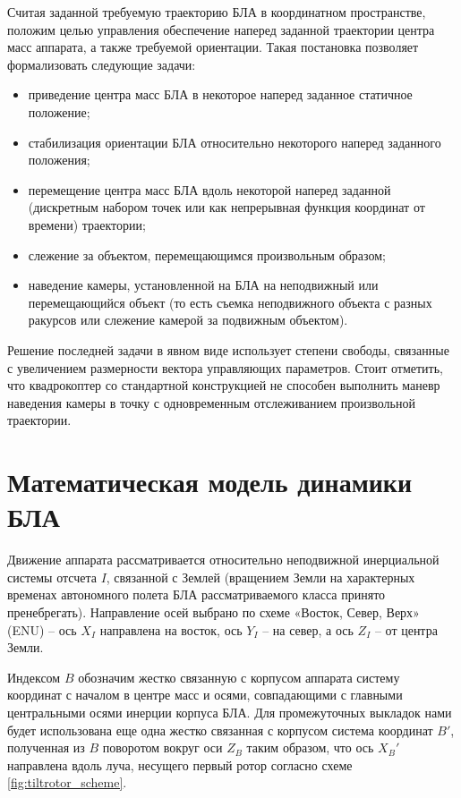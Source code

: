 Считая заданной требуемую траекторию БЛА в координатном пространстве, положим целью управления обеспечение наперед заданной траектории центра масс аппарата, а также требуемой ориентации. Такая постановка позволяет формализовать следующие задачи:
\begin{itemize}
\item приведение центра масс БЛА в некоторое наперед заданное статичное положение;
\item стабилизация ориентации БЛА относительно некоторого наперед заданного положения;
\item перемещение центра масс БЛА вдоль некоторой наперед заданной (дискретным набором точек или как непрерывная функция координат от времени) траектории;
\item слежение за объектом, перемещающимся произвольным образом;
\item наведение камеры, установленной на БЛА на неподвижный или перемещающийся объект (то есть съемка неподвижного объекта с разных ракурсов или слежение камерой за подвижным объектом).
\end{itemize}

Решение последней задачи в явном виде использует степени свободы, связанные с увеличением размерности вектора управляющих параметров. Стоит отметить, что квадрокоптер со стандартной конструкцией не способен выполнить маневр наведения камеры в точку с одновременным отслеживанием произвольной траектории.

\section{Математическая модель динамики БЛА}

Движение аппарата рассматривается относительно неподвижной инерциальной системы отсчета $I$, связанной с Землей (вращением Земли на характерных временах автономного полета БЛА рассматриваемого класса принято пренебрегать).
Направление осей выбрано по схеме «Восток, Север, Верх» (ENU) -- ось \textbf{$X_I$} направлена на восток, ось \textbf{$Y_I$} -- на север, а ось \textbf{$Z_I$} -- от центра Земли.

Индексом $B$ обозначим жестко связанную с корпусом аппарата систему координат с началом в центре масс и осями, совпадающими с главными центральными осями инерции корпуса БЛА.
Для промежуточных выкладок нами будет использована еще одна жестко связанная с корпусом система координат $B'$, полученная из $B$ поворотом вокруг оси $Z_B$ таким образом, что ось $X_B'$ направлена вдоль луча, несущего первый ротор согласно схеме \ref{fig:tiltrotor_scheme}.

